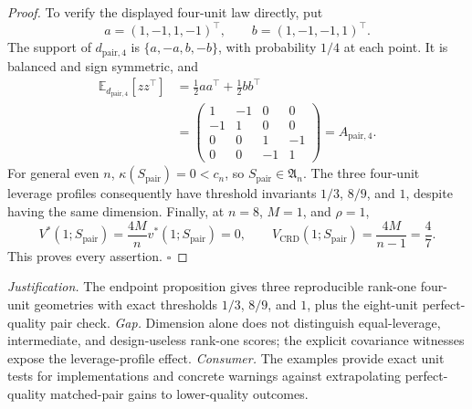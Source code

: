 \documentclass{article}
\begin{document}
\begin{proof}
To verify the displayed four-unit law directly, put
\[
a=(1,-1,1,-1)^\top,
\qquad
b=(1,-1,-1,1)^\top.
\]
The support of \(d_{\mathrm{pair},4}\) is \(\{a,-a,b,-b\}\), with probability \(1/4\) at each point.  It is balanced and sign symmetric, and
\[
\begin{aligned}
\mathbb E_{d_{\mathrm{pair},4}}[zz^\top]
&=\frac12aa^\top+\frac12bb^\top\\
&=\begin{pmatrix}
1&-1&0&0\\
-1&1&0&0\\
0&0&1&-1\\
0&0&-1&1
\end{pmatrix}
=A_{\mathrm{pair},4}.
\end{aligned}
\tag{20}
\]
For general even \(n\), \(\kappa(S_{\mathrm{pair}})=0<c_n\), so \(S_{\mathrm{pair}}\in\mathfrak A_n\).  The three four-unit leverage profiles consequently have threshold invariants \(1/3\), \(8/9\), and \(1\), despite having the same dimension.  Finally, at \(n=8\), \(M=1\), and \(\rho=1\),
\[
V^*(1;S_{\mathrm{pair}})=\frac{4M}{n}v^*(1;S_{\mathrm{pair}})=0,
\qquad
V_{\mathrm{CRD}}(1;S_{\mathrm{pair}})=\frac{4M}{n-1}=\frac47.
\tag{21}
\]
This proves every assertion. \(\square\)
\end{proof}
\par\smallskip\noindent \textit{Justification.} The endpoint proposition gives three reproducible rank-one four-unit geometries with exact thresholds \(1/3\), \(8/9\), and \(1\), plus the eight-unit perfect-quality pair check. \textit{Gap.} Dimension alone does not distinguish equal-leverage, intermediate, and design-useless rank-one scores; the explicit covariance witnesses expose the leverage-profile effect. \textit{Consumer.} The examples provide exact unit tests for implementations and concrete warnings against extrapolating perfect-quality matched-pair gains to lower-quality outcomes.
\end{document}
